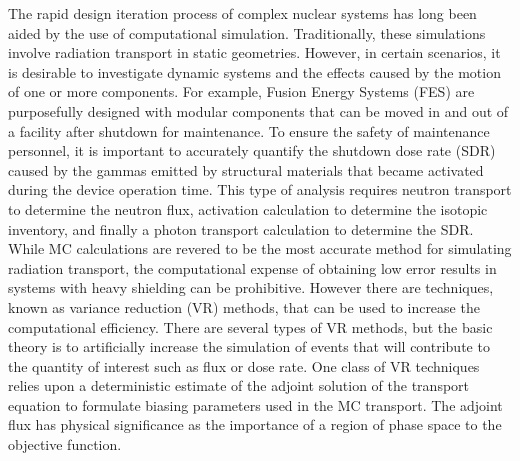 
The rapid design iteration process of complex nuclear systems has long been
aided by the use of computational simulation.  Traditionally, these simulations
involve radiation transport in static geometries.  However, in certain
scenarios, it is desirable to investigate dynamic systems and the effects caused
by the motion of one or more components.  
For example, Fusion Energy Systems
(FES) are purposefully designed with modular components that can be moved in and
out of a facility after shutdown for maintenance.  
To ensure the safety of maintenance personnel, it is important to accurately quantify the
shutdown dose rate (SDR) caused by the gammas emitted by structural materials that became 
activated during the device operation time.  
This type of analysis requires neutron transport to determine the neutron flux,
activation calculation to determine the isotopic inventory, and finally a 
photon transport calculation to determine the SDR.
While MC calculations are revered to be the most accurate method for simulating
radiation transport, the computational expense of obtaining low error results 
in systems with heavy shielding can be prohibitive.  
However there are techniques, known as variance reduction (VR)
methods, that can be used to increase the computational efficiency.  
There are several types
of VR methods, but the basic theory is to artificially increase the simulation of
events that will contribute to the quantity of interest such as flux or dose
rate. 
 One class of VR techniques relies upon a deterministic estimate of the adjoint 
solution of the transport equation to
formulate biasing parameters used in the MC transport. 
The adjoint flux has physical significance as the importance of a region of
phase space to the objective function.

